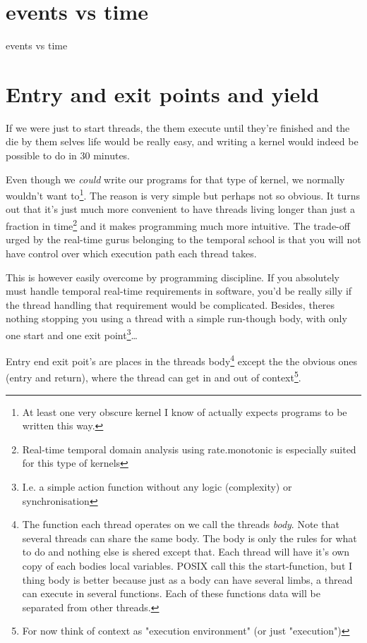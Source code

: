 		\section{events vs time}
		events vs time

		\section{Entry and exit points and yield}
		If we were just to start threads, the them execute until they're finished and the die by them selves life would be really easy, and writing a kernel would indeed be possible to do in 30 minutes.

		Even though we \textit{could} write our programs for that type of kernel, we normally wouldn't want to\footnote{At least one very obscure kernel I know of actually expects programs to be written this way.}. The reason is very simple but perhaps not so obvious. It turns out that it's just much more convenient to have threads living longer than just a fraction in time\footnote{Real-time temporal domain analysis using rate.monotonic is especially suited for this type of kernels} and it makes programming much more intuitive. The trade-off urged by the real-time gurus belonging to the temporal school is that you will not have control over which execution path each thread takes.

		This is however easily overcome by programming discipline. If you absolutely must handle temporal real-time requirements in software, you'd be really silly if the thread handling that requirement would be complicated. Besides, theres nothing stopping you using a thread with a simple run-though body, with only one start and one exit point\footnote{I.e. a simple action function without any logic (complexity) or synchronisation}\ldots

		Entry end exit poit's are places in the threads body\footnote{The function each thread operates on we call the threads \textit{body}. Note that several threads can share the same body. The body is only the rules for what to do and nothing else is shered except that. Each thread will have it's own copy of each bodies local variables. POSIX call this the start-function, but I thing body is better because just as a body can have several limbs, a thread can execute in several functions. Each of these functions data will be separated from other threads.} except the the obvious ones (entry and return), where the thread can get in and out of context\footnote{For now think of context as "execution environment" (or just "execution")}. 

